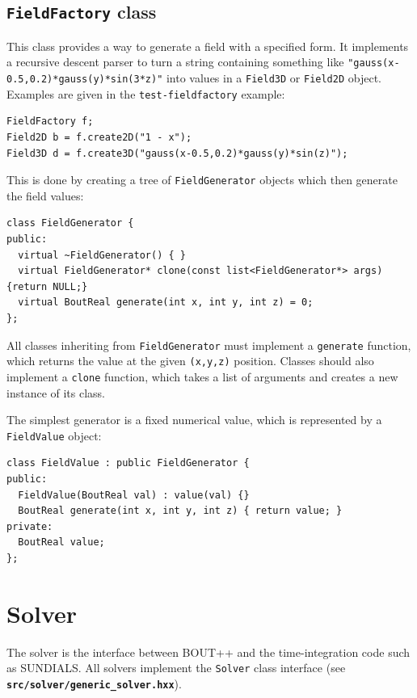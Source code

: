 \documentclass[12pt]{article}
\newcommand{\code}[1]{\texttt{#1}}
\newcommand{\file}[1]{\texttt{\bf #1}}
\begin{document}
\subsection{\lstinline!FieldFactory! class}

This class provides a way to generate a field with a specified form. It implements
a recursive descent parser to turn a string containing something like
\lstinline!"gauss(x-0.5,0.2)*gauss(y)*sin(3*z)"! into values in a \lstinline!Field3D!
or \lstinline!Field2D! object. Examples are given in the \texttt{test-fieldfactory} example:
\begin{lstlisting}
FieldFactory f;
Field2D b = f.create2D("1 - x");
Field3D d = f.create3D("gauss(x-0.5,0.2)*gauss(y)*sin(z)");
\end{lstlisting}

This is done by creating a tree of \lstinline!FieldGenerator! objects
which then generate the field values: 
\begin{lstlisting}[firstnumber=49]
class FieldGenerator {
public:
  virtual ~FieldGenerator() { }
  virtual FieldGenerator* clone(const list<FieldGenerator*> args) {return NULL;}
  virtual BoutReal generate(int x, int y, int z) = 0;
};
\end{lstlisting}
All classes inheriting from \lstinline!FieldGenerator! must implement a
\lstinline!generate! function, which returns the value
at the given \lstinline!(x,y,z)! position. Classes should also implement a
\lstinline!clone! function, which takes a list of arguments and creates a new
instance of its class.

The simplest generator is a fixed numerical value, which is represented
by a \lstinline!FieldValue! object: 
\begin{lstlisting}[firstnumber=59]
class FieldValue : public FieldGenerator {
public:
  FieldValue(BoutReal val) : value(val) {}
  BoutReal generate(int x, int y, int z) { return value; }
private:
  BoutReal value;
};
\end{lstlisting}

\section{Solver}
The solver is the interface between BOUT++ and the time-integration code
such as SUNDIALS. All solvers implement the \code{Solver} class
interface (see \file{src/solver/generic\_solver.hxx}).
\end{document}
